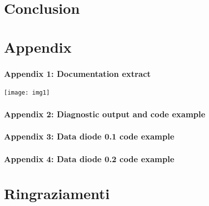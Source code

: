 \documentclass[a4paper, 12pt]{book}
\begin{document}
\chapter{Conclusion}



\chapter{Appendix}
\subsection{Appendix 1: Documentation extract}
\texttt{[image: img1]}
\pagebreak
\subsection{Appendix 2: Diagnostic output and code example}



\pagebreak
\subsection{Appendix 3: Data diode 0.1 code example}


\pagebreak
\subsection{Appendix 4: Data diode 0.2 code example}



\chapter{Ringraziamenti}
\end{document}

